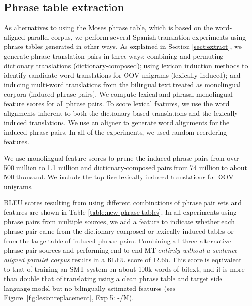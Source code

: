 \documentclass[11pt]{article}
\newcommand{\todopi}[2]{[\textcolor{red}{TODO for #1:} #2]}
\newcommand{\figref}[1]{Figure~\ref{#1}}
\begin{document}
\subsection{Phrase table extraction}\label{sect:exp:pt}
As alternatives to using the Moses phrase table, which is based on the word-aligned parallel corpus, we perform several Spanish translation experiments using phrase tables generated in other ways. As explained in Section \ref{sect:extract}, we generate phrase translation pairs in three ways: combining and permuting dictionary translations (dictionary-composed); using lexicon induction methods to identify candidate word translations for OOV unigrams (lexically induced); and inducing multi-word translations from the bilingual text treated as monolingual corpora (induced phrase pairs). We compute lexical and phrasal monolingual feature scores for all phrase pairs. To score lexical features, we use the word alignments inherent to both the dictionary-based translations and the lexically induced translations. We use an aligner \cite{DeNero07} to generate word alignments for the induced phrase pairs. In all of the experiments, we used random reordering features.

We use monolingual feature scores to prune the induced phrase pairs from over 500 million to 1.1 million and dictionary-composed pairs from 74 million to about 500 thousand. We include the top five lexically induced translations for OOV unigrams.

BLEU scores resulting from using different combinations of phrase pair sets and features are shown in Table \ref{table:new-phrase-tables}. In all experiments using phrase pairs from multiple sources, we add a feature to indicate whether each phrase pair came from the dictionary-composed or lexically induced tables or from the large table of induced phrase pairs.
Combining all three alternative phrase pair sources and performing end-to-end MT \emph{entirely without a sentence-aligned parallel corpus} results in a BLEU score of 12.65. This score is equivalent to that of training an SMT system on about 100k words of bitext, and it is more than double that of %
translating using a clean phrase table and target side language model but no bilingually estimated features (see \figref{fig:lesionreplacement}, Exp 5: -/M).
\end{document}
